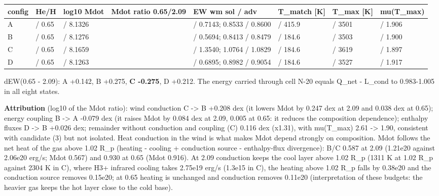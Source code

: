 \documentclass[english,a4paper]{my_memo}
\begin{document}
{\def\LTcaptype{none} %
{\small
\begin{longtable}[]{@{}>{\raggedright\arraybackslash}p{\dimexpr(\linewidth-16\tabcolsep)/8\relax}>{\raggedright\arraybackslash}p{\dimexpr(\linewidth-16\tabcolsep)/8\relax}>{\raggedright\arraybackslash}p{\dimexpr(\linewidth-16\tabcolsep)/8\relax}>{\raggedright\arraybackslash}p{\dimexpr(\linewidth-16\tabcolsep)/8\relax}>{\raggedright\arraybackslash}p{\dimexpr(\linewidth-16\tabcolsep)/8\relax}>{\raggedright\arraybackslash}p{\dimexpr(\linewidth-16\tabcolsep)/8\relax}>{\raggedright\arraybackslash}p{\dimexpr(\linewidth-16\tabcolsep)/8\relax}>{\raggedright\arraybackslash}p{\dimexpr(\linewidth-16\tabcolsep)/8\relax}@{}}
\toprule\noalign{}
config & He/H & log10 Mdot & Mdot ratio 0.65/2.09 & EW wm sol / adv & T\_match {[}K{]} & T\_max {[}K{]} & mu(T\_max) \\
\midrule\noalign{}
\endhead
\bottomrule\noalign{}
\endlastfoot
A & 2.09 / 0.65 & 7.8864 / 8.1326 & 1.763 & 0.7109 / 0.7143; 0.8533 / 0.8600 & 350.7 / 415.9 & 4961 / 3501 & 2.621 / 1.906 \\
B & 2.09 / 0.65 & 7.8029 / 8.1276 & 2.112 & 0.5664 / 0.5694; 0.8413 / 0.8479 & 185.0 / 184.6 & 4889 / 3503 & 2.587 / 1.900 \\
C & 2.09 / 0.65 & 8.0495 / 8.1659 & 1.307 & 1.3510 / 1.3540; 1.0764 / 1.0829 & 185.0 / 184.6 & 5353 / 3619 & 2.610 / 1.897 \\
D & 2.09 / 0.65 & 7.8276 / 8.1263 & 1.990 & 0.6860 / 0.6895; 0.8982 / 0.9054 & 185.0 / 184.6 & 4996 / 3527 & 2.626 / 1.917 \\
\end{longtable}
}
}

dEW(0.65 - 2.09): A +0.142, B +0.275, \textbf{C -0.275}, D +0.212. The energy
carried through cell N-20 equals Q\_net - L\_cond to 0.983-1.005 in all eight
states.

\textbf{Attribution} (log10 of the Mdot ratio): wind conduction C -\textgreater{} B +0.208
dex (it lowers Mdot by 0.247 dex at 2.09 and 0.038 dex at 0.65); energy
coupling B -\textgreater{} A -0.079 dex (it raises Mdot by 0.084 dex at 2.09, 0.005 at
0.65: it reduces the composition dependence); enthalpy fluxes D -\textgreater{} B +0.026
dex; remainder without conduction and coupling (C) 0.116 dex (x1.31), with
mu(T\_max) 2.61 -\textgreater{} 1.90, consistent with candidate (3) but not isolated.
Heat conduction in the wind is what makes Mdot depend strongly on
composition. Mdot follows the net heat of the gas above 1.02 R\_p (heating -
cooling + conduction source - enthalpy-flux divergence): B/C 0.587 at 2.09
(1.21e20 against 2.06e20 erg/s; Mdot 0.567) and 0.930 at 0.65 (Mdot 0.916).
At 2.09 conduction keeps the cool layer above 1.02 R\_p (1311 K at 1.02 R\_p
against 2304 K in C), where H3+ infrared cooling takes 2.75e19 erg/s (1.3e15
in C), the heating above 1.02 R\_p falls by 0.38e20 and the conduction source
removes 0.15e20; at 0.65 heating is unchanged and conduction removes
0.11e20 (interpretation of these budgets: the heavier gas keeps the hot
layer close to the cold base).
\end{document}
